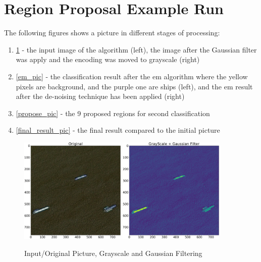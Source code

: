 \section{Region Proposal Example Run}
The following figures shows a picture in different stages of processing:
\begin{enumerate}
	\item \ref{orig_pic} - the input image of the algorithm (left), the image after the Gaussian filter was apply and the encoding was moved to grayscale (right)
	\item \ref{em_pic} - the classification result after the em algorithm where the yellow pixels are background, and the purple one are ships (left), and the em result after the de-noising technique has been applied (right)
	\item \ref{propose_pic} - the 9 proposed regions for second classification
	\item \ref{final_result_pic} - the final result compared to the initial picture
\end{enumerate}

\begin{figure}[H]
	\centering
	\includegraphics[width=0.45\textwidth]{Pictures/011Original.png}
	\includegraphics[width=0.45\textwidth]{Pictures/011GrayScale.png}
	\caption{Input/Original Picture, Grayscale and Gaussian Filtering}
	\label{orig_pic}
\end{figure}


